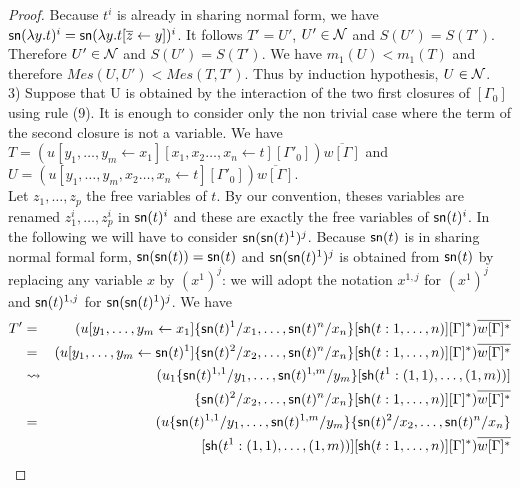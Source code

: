 \documentclass{llncs} %
\newif\ifnonotes\nonotesfalse
\newcommand{\EMPTY}[1]{\ifnonotes\else{\color{red}    \noindent #1}\fi}
\begin{document}
\begin{proof}
%
Because $t^i$ is already in sharing normal form, we have  ${\mathsf{sn}}(\lambda y.t)^i = {\mathsf{sn}}(\lambda y.t[\overline{z}\leftarrow  y])^i$.
It follows $T' = U'$, $U'\in\mathcal{N}$ and $S(U') = S(T')$.
\\
Therefore $U'\in\mathcal{N}$ and $S(U') = S(T')$. We  have  $m_1(U) < m_1(T)$ and therefore  $Mes(U,U') < Mes(T,T')$. Thus by induction hypothesis, $U\in\mathcal{N}$.
%
%
%
%
\medskip
\\
3)  Suppose that U is obtained by the interaction of the two first closures of $[\Gamma_0]$ using rule (9). It is enough to consider only the non trivial case where the term of the second closure is not a variable. We have \\
$T = (u[y_1,\dots,y_m  \leftarrow x_1][x_1,x_2\dots,x_n \leftarrow t][\Gamma'_0])\overline{w[\Gamma]}$   and
\\
$U = (u[y_1,\dots,y_m,x_2\dots,x_n \leftarrow t][\Gamma'_0])\overline{w[\Gamma]}$.
\\
Let $z_1,\dots,z_p$ the free variables of $t$. By our convention, theses variables are renamed $z_1^i,\dots,z_p^i$ in ${\mathsf{sn}}(t)^i$ and these are exactly the free variables of  ${\mathsf{sn}}(t)^i$. In the following we will have to consider ${\mathsf{sn}} ({\mathsf{sn}} (t)^1)^j$. Because ${\mathsf{sn}}(t)$ is in sharing normal formal form, ${\mathsf{sn}}({\mathsf{sn}}(t)) = {\mathsf{sn}}(t)$ and ${\mathsf{sn}} ({\mathsf{sn}} (t)^1)^j$ is obtained from ${\mathsf{sn}}(t)$ by replacing any variable $x$ by $(x^1)^j$: we will  adopt the notation $x^{1,j}$ for $(x^1)^j$ and ${\mathsf{sn}}(t)^{1,j}$ for ${\mathsf{sn}} ({\mathsf{sn}} (t)^1)^j$.
%
We have
%
\begin{eqnarray*}
 T' & = & (u[y_1,\dots,y_m \leftarrow x_1]\{\sn(t)^1/x_1,\dots,\sn(t)^n/x_n\}[\sh (t:1,\dots,n)][\Gamma]^*)\overline{w[\Gamma]^*} \\
    & = & (u[y_1,\dots,y_m \leftarrow \sn(t)^1]\{\sn(t)^2/x_2,\dots,\sn(t)^n/x_n\}[\sh (t:1,\dots,n)][\Gamma]^*)\overline{w[\Gamma]^*} \\
    & \rightsquigarrow & (u_1\{\sn(t)^{1,1}/y_1,\dots,\sn(t)^{1,m}/y_m\}[\sh (t^1:(1,1),\dots,(1,m))] \\
    &   & \{\sn(t)^2/x_2,\dots,\sn(t)^n/x_n\}[\sh (t:1,\dots,n)][\Gamma]^*)\overline{w[\Gamma]^*} \\
    & = & (u\{\sn(t)^{1,1}/y_1,\dots,\sn(t)^{1,m}/y_m\}\{\sn(t)^2/x_2,\dots,\sn(t)^n/x_n\} \\
    &   & [\sh (t^1:(1,1),\dots,(1,m))][\sh (t:1,\dots,n)][\Gamma]^*)\overline{w[\Gamma]^*}   \\

\end{eqnarray*}
\end{proof}
\end{document}
